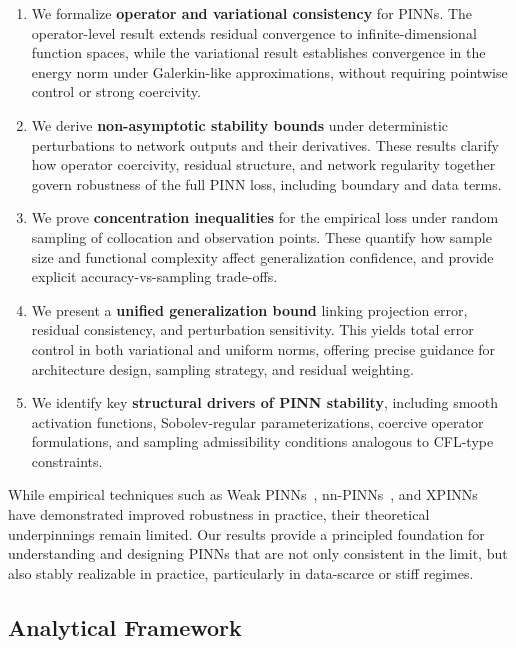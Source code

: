 \documentclass[11pt, a4paper]{article}
\begin{document}
\begin{enumerate}
    \item We formalize \textbf{operator and variational consistency} for PINNs. The operator-level result extends residual convergence to infinite-dimensional function spaces, while the variational result establishes convergence in the energy norm under Galerkin-like approximations, without requiring pointwise control or strong coercivity.

    \item We derive \textbf{non-asymptotic stability bounds} under deterministic perturbations to network outputs and their derivatives. These results clarify how operator coercivity, residual structure, and network regularity together govern robustness of the full PINN loss, including boundary and data terms.

    \item We prove \textbf{concentration inequalities} for the empirical loss under random sampling of collocation and observation points. These quantify how sample size and functional complexity affect generalization confidence, and provide explicit accuracy-vs-sampling trade-offs.

    \item We present a \textbf{unified generalization bound} linking projection error, residual consistency, and perturbation sensitivity. This yields total error control in both variational and uniform norms, offering precise guidance for architecture design, sampling strategy, and residual weighting.

    \item We identify key \textbf{structural drivers of PINN stability}, including smooth activation functions, Sobolev-regular parameterizations, coercive operator formulations, and sampling admissibility conditions analogous to CFL-type constraints.
\end{enumerate}
While empirical techniques such as Weak PINNs~\cite{deryck2024wpinns}, nn-PINNs~\cite{mahmoudabadbozchelou2022nn}, and XPINNs~\cite{hu2022xpinns} have demonstrated improved robustness in practice, their theoretical underpinnings remain limited. Our results provide a principled foundation for understanding and designing PINNs that are not only consistent in the limit, but also stably realizable in practice, particularly in data-scarce or stiff regimes.

\subsection{Analytical Framework}
\end{document}
